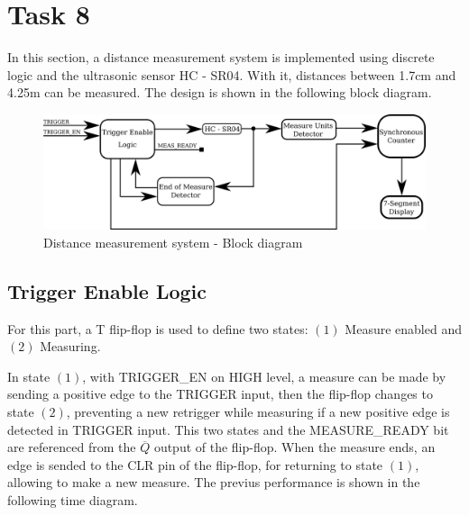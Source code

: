 \newpage

\section*{Task 8}
In this section, a distance measurement system is 
implemented using discrete logic and the ultrasonic 
sensor HC - SR04. With it, distances between 1.7cm 
and 4.25m can be measured. The design is shown in 
the following block diagram.

\begin{figure}[H]
    \begin{centering}
    \includegraphics[width=1\textwidth]{data/blockDiagram}
    \par\end{centering}
    \caption{Distance measurement system - Block diagram}
\end{figure}

\subsection*{Trigger Enable Logic}
For this part, a T flip-flop is used to
define two states: $(1)$ Measure enabled and $(2)$ Measuring.
\par
In state $(1)$, with TRIGGER\_EN on HIGH level, a measure 
can be made by sending a positive edge to the TRIGGER input, 
then the flip-flop changes to state $(2)$, preventing a new 
retrigger while measuring if a new positive edge is detected 
in TRIGGER input. This two states and the MEASURE\_READY bit 
are referenced from the $\overline{Q}$ output of the flip-flop. 
When the measure ends, an edge is sended to 
the CLR pin of the flip-flop, for returning to state $(1)$, allowing
to make a new measure. The previus performance is shown in the 
following time diagram.

